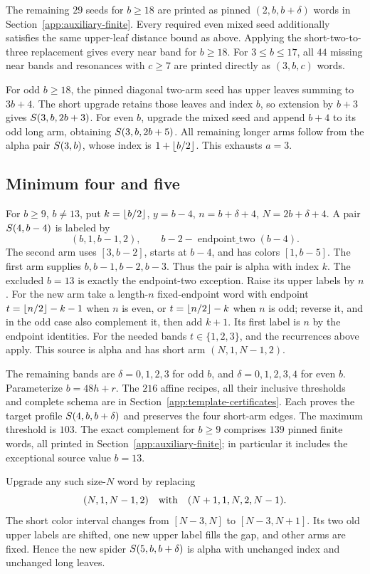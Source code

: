 The remaining $29$ seeds for $b\ge18$ are printed as pinned $(2,b,b+\delta)$ words in Section~\ref{app:auxiliary-finite}. Every required even mixed seed additionally satisfies the same upper-leaf distance bound as above. Applying the short-two-to-three replacement gives every near band for $b\ge18$. For $3\le b\le17$, all $44$ missing near bands and resonances with $c\ge7$ are printed directly as $(3,b,c)$ words.

For odd $b\ge18$, the pinned diagonal two-arm seed has upper leaves summing to $3b+4$. The short upgrade retains those leaves and index $b$, so extension by $b+3$ gives $S\!\left(3,b,2b+3\right)$. For even $b$, upgrade the mixed seed and append $b+4$ to its odd long arm, obtaining $S\!\left(3,b,2b+5\right)$. All remaining longer arms follow from the alpha pair $S\!\left(3,b\right)$, whose index is $1+\left\lfloor b/2\right\rfloor$. This exhausts $a=3$.

\subsection{Minimum four and five}
For $b\ge9$, $b\ne13$, put $k=\left\lfloor b/2\right\rfloor$, $y=b-4$, $n=b+\delta+4$, $N=2b+\delta+4$. A pair $S\!\left(4,b-4\right)$ is labeled by
\[
(b,1,b-1,2),\qquad b-2-\operatorname{endpoint\_two}(b-4).
\]
The second arm uses $[3,b-2]$, starts at $b-4$, and has colors $[1,b-5]$. The first arm supplies $b,b-1,b-2,b-3$. Thus the pair is alpha with index $k$. The excluded $b=13$ is exactly the endpoint-two exception.
Raise its upper labels by $n$. For the new arm take a length-$n$ fixed-endpoint word with endpoint $t=\left\lfloor n/2\right\rfloor-k-1$ when $n$ is even, or $t=\left\lfloor n/2\right\rfloor-k$ when $n$ is odd; reverse it, and in the odd case also complement it, then add $k+1$. Its first label is $n$ by the endpoint identities. For the needed bands $t\in\{1,2,3\}$, and the recurrences above apply. This source is alpha and has short arm $(N,1,N-1,2)$.

The remaining bands are $\delta=0,1,2,3$ for odd $b$, and $\delta=0,1,2,3,4$ for even $b$. Parameterize $b=48h+r$. The $216$ affine recipes, all their inclusive thresholds and complete schema are in Section~\ref{app:template-certificates}. Each proves the target profile $S\!\left(4,b,b+\delta\right)$ and preserves the four short-arm edges. The maximum threshold is $103$. The exact complement for $b\ge9$ comprises $139$ pinned finite words, all printed in Section~\ref{app:auxiliary-finite}; in particular it includes the exceptional source value $b=13$.

Upgrade any such size-$N$ word by replacing
\[
(N,1,N-1,2)\quad\hbox{with}\quad(N+1,1,N,2,N-1).
\]
The short color interval changes from $[N-3,N]$ to $[N-3,N+1]$. Its two old upper labels are shifted, one new upper label fills the gap, and other arms are fixed. Hence the new spider $S\!\left(5,b,b+\delta\right)$ is alpha with unchanged index and unchanged long leaves.


